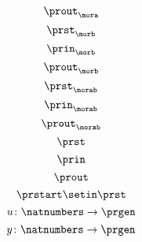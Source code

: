 {\begin{forslides}
        \begin{equation}
            \label{eq:mora-prout}
            \prout_{\mora}
        \end{equation}
        \begin{equation}
            \label{eq:morb-prst}
            \prst_{\morb}
        \end{equation}
        \begin{equation}
            \label{eq:morb-prin}
            \prin_{\morb}
        \end{equation}
        \begin{equation}
            \label{eq:morb-prout}
            \prout_{\morb}
        \end{equation}
        \begin{equation}
            \label{eq:morab-prst}
            \prst_{\morab}
        \end{equation}
        \begin{equation}
            \label{eq:morab-prin}
            \prin_{\morab}
        \end{equation}
        \begin{equation}
            \label{eq:morab-prout}
            \prout_{\morab}
        \end{equation}
        \begin{equation}
            \label{eq:gen-prst}
            \prst
        \end{equation}
        \begin{equation}
            \label{eq:gen-prin}
            \prin
        \end{equation}
        \begin{equation}
            \label{eq:gen-prout}
            \prout
        \end{equation}
        \begin{equation}
            \label{eq:moore-start}
            \prstart \setin \prst
        \end{equation}
        \begin{equation}
            \label{eq:prgen-u}
            u\colon \natnumbers \to \prgen
        \end{equation}
        \begin{equation}
            \label{eq:prgen-y}
            y\colon \natnumbers \to \prgen
        \end{equation}
        \begin{equation}

\end{equation}
\end{forslides}}
